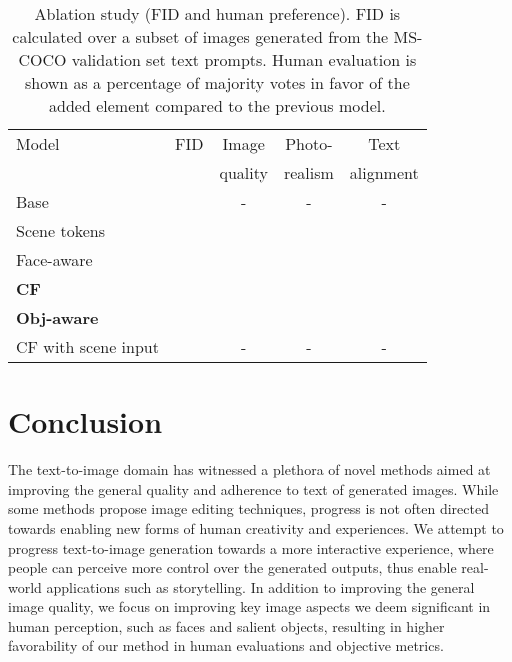 \documentclass[final]{cvpr}
\begin{document}
\setlength{\tabcolsep}{4pt}
\begin{table}
\begin{center}
\label{table:abl_study}
\begin{tabular}{lc|ccc}
\hline\noalign{\smallskip}
Model & FID & Image & Photo- & Text \\
& & quality & realism & alignment  \\
\noalign{\smallskip}
\hline
\noalign{\smallskip}
Base &  & - & - & - \\
Scene tokens &  &   &  &  \\
Face-aware &  &   &  &  \\
\textbf{CF} &  &   &  &  \\
\textbf{Obj-aware} &  &   &  &  \\ 
\hline
CF with scene input &  & - & - & - \\
\hline
\end{tabular}
\vspace{0.2cm}
\caption{Ablation study (FID and human preference). FID is calculated over a subset of  images generated from the MS-COCO validation set text prompts. Human evaluation is shown as a percentage of majority votes in favor of the added element compared to the previous model.}

\end{center}
\end{table}
\setlength{\tabcolsep}{1.4pt}

\section{Conclusion}
The text-to-image domain has witnessed a plethora of novel methods aimed at improving the general quality and adherence to text of generated images. While some methods propose image editing techniques, progress is not often directed towards enabling new forms of human creativity and experiences. We attempt to progress text-to-image generation towards a more interactive experience, where people can perceive more control over the generated outputs, thus enable real-world applications such as storytelling. In addition to improving the general image quality, we focus on improving key image aspects we deem significant in human perception, such as faces and salient objects, resulting in higher favorability of our method in human evaluations and objective metrics.

{\small


}
\clearpage
\appendix
\end{document}
